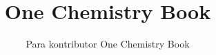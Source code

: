 \documentclass[11pt,a4paper,twoside,openany]{book}
\title{One Chemistry Book}
\author{Para kontributor One Chemistry Book}
\date{\bookdate}
\begin{document}
\frontmatter




\tableofcontents

\mainmatter



\appendix
\part{\omsolutionspart}


\backmatter
\printindex
\end{document}
